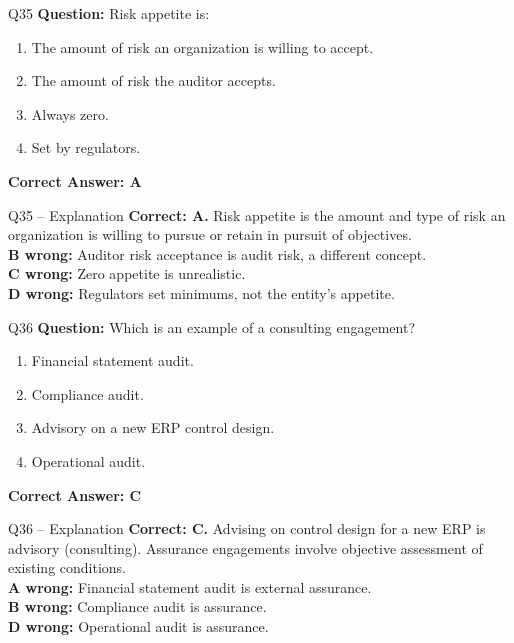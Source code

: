\documentclass[aspectratio=169,10pt]{beamer}
\begin{document}
	\begin{frame}[t]{Q35}
		\small
		\textbf{Question:} Risk appetite is:
		\begin{enumerate}[label=\Alph*.,itemsep=1pt,topsep=2pt]
			\item The amount of risk an organization is willing to accept.
			\item The amount of risk the auditor accepts.
			\item Always zero.
			\item Set by regulators.
		\end{enumerate}
		\vspace{4pt}
		\textbf{Correct Answer: A}
	\end{frame}
	
	\begin{frame}[t]{Q35 -- Explanation}
		\small
		\textbf{Correct: A.} Risk appetite is the amount and type of risk an organization is willing to pursue or retain in pursuit of objectives. \\[4pt]
		\textbf{B wrong:} Auditor risk acceptance is audit risk, a different concept. \\[2pt]
		\textbf{C wrong:} Zero appetite is unrealistic. \\[2pt]
		\textbf{D wrong:} Regulators set minimums, not the entity's appetite.
	\end{frame}
	
	\begin{frame}[t]{Q36}
		\small
		\textbf{Question:} Which is an example of a consulting engagement?
		\begin{enumerate}[label=\Alph*.,itemsep=1pt,topsep=2pt]
			\item Financial statement audit.
			\item Compliance audit.
			\item Advisory on a new ERP control design.
			\item Operational audit.
		\end{enumerate}
		\vspace{4pt}
		\textbf{Correct Answer: C}
	\end{frame}
	
	\begin{frame}[t]{Q36 -- Explanation}
		\small
		\textbf{Correct: C.} Advising on control design for a new ERP is advisory (consulting). Assurance engagements involve objective assessment of existing conditions. \\[4pt]
		\textbf{A wrong:} Financial statement audit is external assurance. \\[2pt]
		\textbf{B wrong:} Compliance audit is assurance. \\[2pt]
		\textbf{D wrong:} Operational audit is assurance.
	\end{frame}
	
\end{document}
